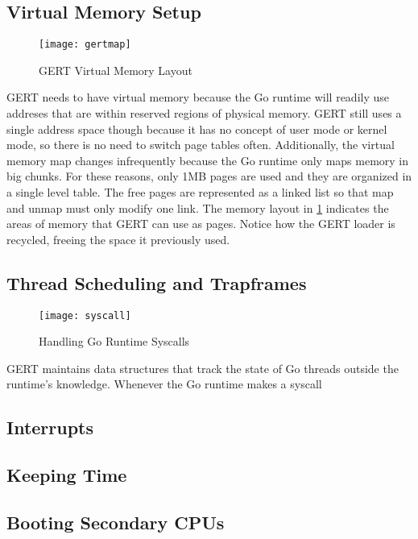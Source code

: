 \subsection{Virtual Memory Setup}
\begin{figure}[h]
\begin{center}
  \texttt{[image: gertmap]}
\end{center}
  \caption{GERT Virtual Memory Layout} \label{fig:gertmap}
\end{figure}

GERT needs to have virtual memory because the Go runtime will readily use addreses that are within
reserved regions of physical memory. GERT still uses a single address space though because it has no concept
of user mode or kernel mode, so there is no need to switch page tables often. Additionally, the virtual memory
map changes infrequently because the Go runtime
only maps memory in big chunks. For these reasons, only 1MB pages are used and they are organized in a single
level table. The free pages are represented as a linked list so that map and unmap must only modify one link.
The memory layout in \ref{fig:gertmap} indicates the areas of memory that GERT can use as pages.
Notice how the GERT loader is recycled, freeing the space it previously used.

\subsection{Thread Scheduling and Trapframes}
\begin{figure}[h]
\begin{center}
  \texttt{[image: syscall]}
\end{center}
  \caption{Handling Go Runtime Syscalls} \label{fig:syscall}
\end{figure}

GERT maintains data structures that track the state of Go threads outside the runtime's
knowledge. Whenever the Go runtime makes a syscall



\subsection{Interrupts}
\subsection{Keeping Time}
\subsection{Booting Secondary CPUs}

